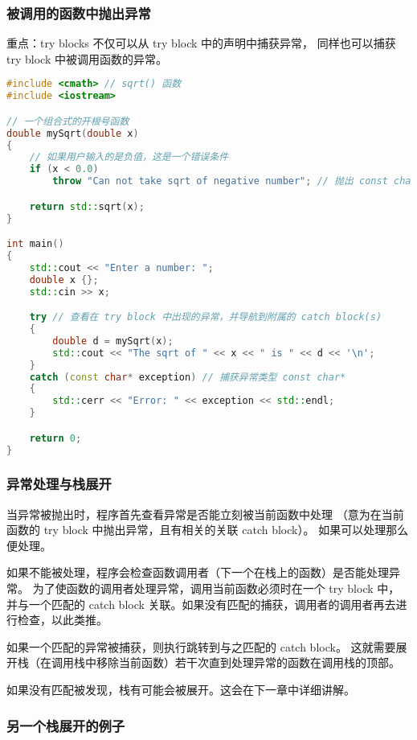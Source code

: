 \documentclass[../../LearnCpp.tex]{subfiles}
\begin{document}

\subsubsection*{被调用的函数中抛出异常}

重点：try blocks 不仅可以从 try block 中的声明中捕获异常，
同样也可以捕获 try block 中被调用函数的异常。

\begin{lstlisting}[language=C++]
#include <cmath> // sqrt() 函数
#include <iostream>

// 一个组合式的开根号函数
double mySqrt(double x)
{
    // 如果用户输入的是负值，这是一个错误条件
    if (x < 0.0)
        throw "Can not take sqrt of negative number"; // 抛出 const char* 类型的异常

    return std::sqrt(x);
}

int main()
{
    std::cout << "Enter a number: ";
    double x {};
    std::cin >> x;

    try // 查看在 try block 中出现的异常，并导航到附属的 catch block(s)
    {
        double d = mySqrt(x);
        std::cout << "The sqrt of " << x << " is " << d << '\n';
    }
    catch (const char* exception) // 捕获异常类型 const char*
    {
        std::cerr << "Error: " << exception << std::endl;
    }

    return 0;
}
\end{lstlisting}

\subsubsection*{异常处理与栈展开}

当异常被抛出时，程序首先查看异常是否能立刻被当前函数中处理
（意为在当前函数的 try block 中抛出异常，且有相关的关联 catch block）。
如果可以处理那么便处理。

如果不能被处理，程序会检查函数调用者（下一个在栈上的函数）是否能处理异常。
为了使函数的调用者处理异常，调用当前函数必须时在一个 try block 中，
并与一个匹配的 catch block 关联。如果没有匹配的捕获，调用者的调用者再去进行检查，以此类推。

如果一个匹配的异常被捕获，则执行跳转到与之匹配的 catch block。
这就需要展开栈（在调用栈中移除当前函数）若干次直到处理异常的函数在调用栈的顶部。

如果没有匹配被发现，栈有可能会被展开。这会在下一章中详细讲解。

\subsubsection*{另一个栈展开的例子}
\end{document}
